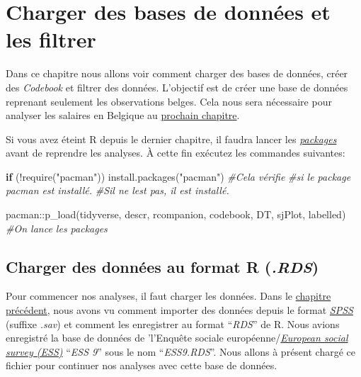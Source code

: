 \documentclass[
]{book}
\newenvironment{Shaded}{\begin{snugshade}}{\end{snugshade}}
\newcommand{\CommentTok}[1]{\textcolor[rgb]{0.56,0.35,0.01}{\textit{#1}}}
\newcommand{\ControlFlowTok}[1]{\textcolor[rgb]{0.13,0.29,0.53}{\textbf{#1}}}
\newcommand{\FunctionTok}[1]{\textcolor[rgb]{0.00,0.00,0.00}{#1}}
\newcommand{\NormalTok}[1]{#1}
\newcommand{\SpecialCharTok}[1]{\textcolor[rgb]{0.00,0.00,0.00}{#1}}
\newcommand{\StringTok}[1]{\textcolor[rgb]{0.31,0.60,0.02}{#1}}
\begin{document}
\hypertarget{charge_code_filtrer}{%
\chapter{Charger des bases de données et les filtrer}\label{charge_code_filtrer}}

Dans ce chapitre nous allons voir comment charger des bases de données, créer des \emph{Codebook} et filtrer des données. L'objectif est de créer une base de données reprenant seulement les observations belges. Cela nous sera nécessaire pour analyser les salaires en Belgique au \protect\hyperlink{salaire_belge_stat_desc}{prochain chapitre}.

Si vous avez éteint R depuis le dernier chapitre, il faudra lancer les \protect\hyperlink{packages}{\emph{packages}} avant de reprendre les analyses. À cette fin exécutez les commandes suivantes:

\begin{Shaded}
\begin{Highlighting}[]
\ControlFlowTok{if}\NormalTok{ (}\SpecialCharTok{!}\FunctionTok{require}\NormalTok{(}\StringTok{"pacman"}\NormalTok{)) }\FunctionTok{install.packages}\NormalTok{(}\StringTok{"pacman"}\NormalTok{) }\CommentTok{\#Cela vérifie}
                             \CommentTok{\#si le package pacman est installé.}
                             \CommentTok{\#S\textquotesingle{}il ne l\textquotesingle{}est pas, il est installé.}

\NormalTok{pacman}\SpecialCharTok{::}\FunctionTok{p\_load}\NormalTok{(tidyverse, descr, rcompanion, codebook,}
\NormalTok{               DT, sjPlot, labelled) }\CommentTok{\#On lance les packages}
\end{Highlighting}
\end{Shaded}

\hypertarget{charger-des-donnuxe9es-au-format-r-.rds}{%
\section{\texorpdfstring{Charger des données au format R (\emph{.RDS})}{Charger des données au format R (.RDS)}}\label{charger-des-donnuxe9es-au-format-r-.rds}}

Pour commencer nos analyses, il faut charger les données. Dans le \protect\hyperlink{import_donnees}{chapitre précédent}, nous avons vu comment importer des données depuis le format \href{https://www.ibm.com/fr-fr/products/spss-statistics}{\emph{SPSS}} (suffixe \emph{.sav}) et comment les enregistrer au format ``\emph{RDS}'' de R. Nous avions enregistré la base de données de 'l'Enquête sociale européenne/\href{https://www.europeansocialsurvey.org/}{\emph{European social survey (ESS)}} ``\emph{ESS 9}'' sous le nom ``\emph{ESS9.RDS}''. Nous allons à présent chargé ce fichier pour continuer nos analyses avec cette base de données.
\end{document}

